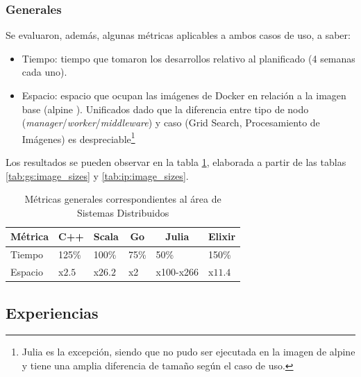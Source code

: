 \documentclass[11pt]{article}
\let\Oldsubsection\subsection
\renewcommand{\subsection}{\FloatBarrier\Oldsubsection}
\let\Oldsubsubsection\subsubsection
\renewcommand{\subsubsection}{\FloatBarrier\Oldsubsubsection}
\newcommand{\english}[1]{\textit{#1}}
\begin{document}
\subsubsection{Generales} \label{sec:general_metrics}

Se evaluaron, además, algunas métricas aplicables a ambos casos de uso, a saber:

\begin{itemize}
    \item Tiempo: tiempo que tomaron los desarrollos relativo al planificado (4 semanas cada uno).
    \item Espacio: espacio que ocupan las imágenes de Docker en relación a la imagen base (alpine \cite{metrics:apline}). Unificados dado que la diferencia entre tipo de nodo (\english{manager}/\english{worker}/\english{middleware}) y caso (Grid Search, Procesamiento de Imágenes) es despreciable\footnote{Julia es la excepción, siendo que no pudo ser ejecutada en la imagen de alpine y tiene una amplia diferencia de tamaño según el caso de uso.}
\end{itemize}

Los resultados se pueden observar en la tabla \ref{tab:sis_dist:general_metrics}, elaborada a partir de las tablas \ref{tab:gs:image_sizes} y \ref{tab:ip:image_sizes}.

\begin{table}
\centering
\begin{tabular}{|l|l|l|l|l|l|}
\hline
\multicolumn{1}{|c|}{Métrica} & \multicolumn{1}{c|}{C++} & \multicolumn{1}{c|}{Scala} & \multicolumn{1}{c|}{Go} & \multicolumn{1}{c|}{Julia} & \multicolumn{1}{c|}{Elixir} \\ \hline
Tiempo                        & 125\%                    & 100\%                      & 75\%                    & 50\%                       & 150\%                       \\ \hline
Espacio                       & x$2.5$                     & x$26.2$                      & x2                      & x100-x266                  & x$11.4$                       \\ \hline
\end{tabular}
\caption{Métricas generales correspondientes al área de Sistemas Distribuidos}
\label{tab:sis_dist:general_metrics}
\end{table}

\subsection{Experiencias}
\end{document}
